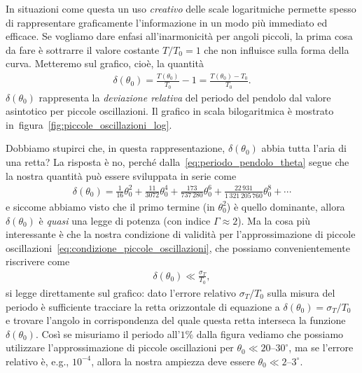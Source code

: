 In situazioni come questa un uso \emph{creativo} delle scale logaritmiche
permette spesso di rappresentare graficamente l'informazione in un modo
più immediato ed efficace. Se vogliamo dare enfasi all'inarmonicità per
angoli piccoli, la prima cosa da fare è sottrarre il valore costante
$T/T_0 = 1$ che non influisce sulla forma della curva. Metteremo sul grafico,
cioè, la quantità
\begin{align}
  \delta(\theta_0) = \frac{T(\theta_0)}{T_0} - 1 = \frac{T(\theta_0) - T_0}{T_0}.
\end{align}
$\delta(\theta_0)$ rappresenta la \emph{deviazione relativa} del periodo del
pendolo dal valore asintotico per piccole oscillazioni. Il grafico in scala
bilogaritmica \`e mostrato in~figura~\ref{fig:piccole_oscillazioni_log}.


Dobbiamo stupirci che, in questa rappresentazione, $\delta(\theta_0)$ abbia tutta
l'aria di una retta? La risposta è no, perché dalla~\eqref{eq:periodo_pendolo_theta}
segue che la nostra quantità può essere sviluppata in serie come
\begin{align*}
  \delta(\theta_0) = \frac{1}{16}\theta_0^2 +
  \frac{11}{3072}\theta_0^4 + \frac{173}{737\,280}\theta_0^6 +
  \frac{22\,931}{1\,321\,205\,760}\theta_0^8 +
  \cdots
\end{align*}
e siccome abbiamo visto che il primo termine (in $\theta_0^2$) è quello
dominante, allora $\delta(\theta_0)$ è \emph{quasi} una legge di potenza
(con indice $\Gamma \approx 2$). Ma la cosa più interessante è che la nostra
condizione di validità per l'approssimazione di piccole
oscillazioni~\eqref{eq:condizione_piccole_oscillazioni}, che possiamo
convenientemente riscrivere come
\begin{align*}
  \delta(\theta_0) \ll \frac{\sigma_T}{T_0},
\end{align*}
si legge direttamente sul grafico: dato l'errore relativo $\sigma_T/T_0$ sulla
misura del periodo è sufficiente tracciare la retta orizzontale di
equazione a $\delta(\theta_0) = \sigma_T/T_0$ e trovare l'angolo in
corrispondenza del quale questa retta interseca la funzione $\delta(\theta_0)$.
Così se misuriamo il periodo all'$1\%$ dalla figura vediamo che possiamo
utilizzare l'approssimazione di piccole oscillazioni per
$\theta_0 \ll 20$--$30^\circ$, ma se l'errore relativo è, e.g., $10^{-4}$,
allora la nostra ampiezza deve essere $\theta_0 \ll 2$--$3^\circ$.


